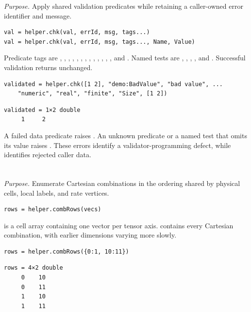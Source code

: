 \textit{Purpose.} Apply shared validation predicates while retaining a caller-owned error identifier and message.

\syntaxhead
\begin{lstlisting}[style=dpsyntax]
val = helper.chk(val, errId, msg, tags...)
val = helper.chk(val, errId, msg, tags..., Name, Value)
\end{lstlisting}

\descriptionhead
Predicate tags are , , , , , , , , , , , , , and .  Named tests are , , , , and .  Successful validation returns  unchanged.

\examplehead
\begin{lstlisting}[style=dpmatlab]
validated = helper.chk([1 2], "demo:BadValue", "bad value", ...
    "numeric", "real", "finite", "Size", [1 2])
\end{lstlisting}
\begin{lstlisting}[style=dpoutput]
validated = 1×2 double
     1     2
\end{lstlisting}

\remarkshead
A failed data predicate raises . An unknown predicate or a named test that omits its value raises . These errors identify a validator-programming defect, while  identifies rejected caller data.

\section{\texorpdfstring{}{helper.combRows}}

\textit{Purpose.} Enumerate Cartesian combinations in the ordering shared by physical cells, local labels, and rate vertices.

\syntaxhead
\begin{lstlisting}[style=dpsyntax]
rows = helper.combRows(vecs)
\end{lstlisting}

\descriptionhead
{} is a cell array containing one vector per tensor axis.  contains every Cartesian combination, with earlier dimensions varying more slowly.

\examplehead
\begin{lstlisting}[style=dpmatlab]
rows = helper.combRows({0:1, 10:11})
\end{lstlisting}
\begin{lstlisting}[style=dpoutput]
rows = 4×2 double
     0    10
     0    11
     1    10
     1    11
\end{lstlisting}

